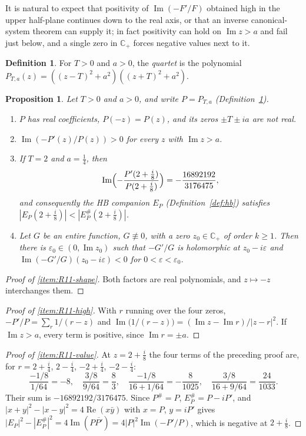 \documentclass[11pt]{amsart}
\theoremstyle{plain}
\newtheorem{proposition}[theorem]{Proposition}
\theoremstyle{definition}
\newtheorem{definition}[theorem]{Definition}
\theoremstyle{remark}
\numberwithin{equation}{section}
\newcommand{\Cp}{\mathbb{C}_{+}}
\DeclareMathOperator{\Ima}{Im}
\DeclareMathOperator{\Rea}{Re}
\renewcommand{\Re}{\Rea}
\renewcommand{\Im}{\Ima}
\begin{document}
It is natural to expect that positivity of $\Im(-F'/F)$ obtained high in
the upper half-plane continues down to the real axis, or that an inverse
canonical-system theorem can supply it; in fact positivity can hold on
$\Im z>a$ and fail just below, and a single zero in $\Cp$ forces
negative values next to it.

\begin{definition}\label{def:R11-quartet}
For $T>0$ and $a>0$, the \emph{quartet} is the polynomial
$P_{T,a}(z)=((z-T)^2+a^2)((z+T)^2+a^2)$.
\end{definition}

\begin{proposition}\label{prop:R11}
Let $T>0$ and $a>0$, and write $P=P_{T,a}$
(Definition~\ref{def:R11-quartet}).
\begin{enumerate}[label=(\roman*)]
\item\label{item:R11-shape} $P$ has real coefficients, $P(-z)=P(z)$, and
  its zeros $\pm T\pm ia$ are not real.
\item\label{item:R11-high} $\Im(-P'(z)/P(z))>0$ for every $z$ with
  $\Im z>a$.
\item\label{item:R11-value} If $T=2$ and $a=\tfrac14$, then
  \[
  \Im\Bigl(-\frac{P'(2+\tfrac i8)}{P(2+\tfrac i8)}\Bigr)
  =-\frac{16892192}{3176475},
  \]
  and consequently the HB companion $E_P$ (Definition~\ref{def:hb})
  satisfies $|E_P(2+\tfrac i8)|<|E_P^\#(2+\tfrac i8)|$.
\item\label{item:R11-pole} Let $G$ be an entire function,
  $G\not\equiv0$, with a zero $z_0\in\Cp$ of order $k\ge1$. Then there
  is $\varepsilon_0\in(0,\Im z_0)$ such that $-G'/G$ is holomorphic at
  $z_0-i\varepsilon$ and $\Im(-G'/G)(z_0-i\varepsilon)<0$ for
  $0<\varepsilon<\varepsilon_0$.
\end{enumerate}
\end{proposition}

\begin{proof}[Proof of \ref{item:R11-shape}]
Both factors are real polynomials, and $z\mapsto-z$ interchanges them.
\end{proof}

\begin{proof}[Proof of \ref{item:R11-high}]
With $r$ running over the four zeros,
$-P'/P=\sum_r1/(r-z)$ and
$\Im\bigl(1/(r-z)\bigr)=(\Im z-\Im r)/|z-r|^2$. If $\Im z>a$, every term
is positive, since $\Im r=\pm a$.
\end{proof}

\begin{proof}[Proof of \ref{item:R11-value}]
At $z=2+\tfrac i8$ the four terms of the preceding proof are, for
$r=2+\tfrac i4$, $2-\tfrac i4$, $-2+\tfrac i4$, $-2-\tfrac i4$:
\[
\frac{-1/8}{1/64}=-8,\quad
\frac{3/8}{9/64}=\frac83,\quad
\frac{-1/8}{16+1/64}=-\frac{8}{1025},\quad
\frac{3/8}{16+9/64}=\frac{24}{1033}.
\]
Their sum is $-16892192/3176475$. Since $P^\#=P$, $E_P^\#=P-iP'$, and
$|x+y|^2-|x-y|^2=4\Re(x\bar y)$ with $x=P$, $y=iP'$ gives
$|E_P|^2-|E_P^\#|^2=4\Im(P\overline{P'})=4|P|^2\Im(-P'/P)$, which is
negative at $2+\tfrac i8$.
\end{proof}
\end{document}
